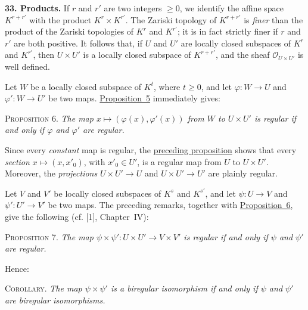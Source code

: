 
\medskip
{}\label{fac:II:1:no:33}
\textbf{33. Products.}
If $r$ and $r'$ are two integers $\geq 0$, we identify the affine space $K^{r+r'}$ with the product $K^r\times K^{r'}$. The Zariski topology of $K^{r+r'}$ is \textit{finer} than the product of the Zariski topologies of $K^r$ and $K^{r'}$; it is in fact strictly finer if $r$ and $r'$ are both positive. It follows that, if $U$ and $U'$ are locally closed subspaces of $K^r$ and $K^{r'}$, then $U\times U'$ is a locally closed subspace of $K^{r+r'}$, and the sheaf $\mathcal{O}_{U\times U'}$ is well defined.

Let $W$ be a locally closed subspace of $K^t$, where $t\geq0$, and let $\varphi:W\to U$ and $\varphi':W\to U'$ be two maps. \hyperref[fac:II:1:no:32:prop:5]{Proposition~5} immediately gives:

\label{fac:II:1:no:33:prop:6}
\textsc{Proposition 6.} \textit{The map $x\mapsto(\varphi(x),\varphi'(x))$ from $W$ to $U\times U'$ is regular if and only if $\varphi$ and $\varphi'$ are regular.}

Since every \textit{constant} map is regular, the \hyperref[fac:II:1:no:33:prop:6]{preceding proposition} shows that every \textit{section} $x\mapsto(x,x'_0)$, with $x'_0\in U'$, is a regular map from $U$ to $U\times U'$. Moreover, the \textit{projections} $U\times U'\to U$ and $U\times U'\to U'$ are plainly regular.

Let $V$ and $V'$ be locally closed subspaces of $K^s$ and $K^{s'}$, and let $\psi:U\to V$ and $\psi':U'\to V'$ be two maps. The preceding remarks, together with \hyperref[fac:II:1:no:33:prop:6]{Proposition~6}, give the following (cf. [1], Chapter~IV):

\label{fac:II:1:no:33:prop:7}
\textsc{Proposition 7.} \textit{The map $\psi\times\psi':U\times U'\to V\times V'$ is regular if and only if $\psi$ and $\psi'$ are regular.}

Hence:

\label{fac:II:1:no:33:cor:prop:7}
\textsc{Corollary.} \textit{The map $\psi\times\psi'$ is a biregular isomorphism if and only if $\psi$ and $\psi'$ are biregular isomorphisms.}
